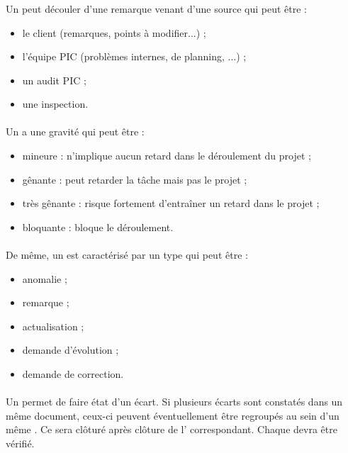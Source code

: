 \subsubsection*{\FT}
\paragraph*{} Un \FT{} peut découler d'une remarque venant d'une source qui peut être :

\begin{itemize}
	\item le client (remarques, points à modifier...) ;
	\item l'équipe PIC (problèmes internes, de planning, ...) ;
	\item un audit PIC ;
	\item une inspection.
\end{itemize}

\paragraph*{} Un \FTCourt{} a une gravité qui peut être :
\begin{itemize}
\item mineure : n'implique aucun retard dans le déroulement du projet ;
\item gênante : peut retarder la tâche mais pas le projet ;
\item très gênante : risque fortement d'entraîner un retard dans le projet ;
\item bloquante : bloque le déroulement.
\end{itemize}

\paragraph*{} De même, un \FTCourt{} est caractérisé par un type qui peut être :
\begin{itemize}
\item anomalie ;
\item remarque ;
\item actualisation ;
\item demande d'évolution ;
\item demande de correction.
\end{itemize}

\paragraph*{} Un \FTCourt{} permet de faire état d'un écart. Si plusieurs écarts sont constatés dans un même
document, ceux-ci peuvent éventuellement être regroupés au sein d'un même \FTCourt . Ce \FTCourt{} sera
clôturé après clôture de l'\OCCourt{} correspondant. Chaque \OCCourt{} devra être vérifié.
